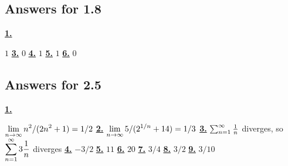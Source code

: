 \subsection *{Answers for 1.8}
\hypertarget {a:1.8.1}{\hyperlink {e:1.8.1}{\bfseries 1.}} \mdseries $1$\qquad 
\hypertarget {a:1.8.3}{\hyperlink {e:1.8.3}{\bfseries 3.}} \mdseries $0$\qquad 
\hypertarget {a:1.8.4}{\hyperlink {e:1.8.4}{\bfseries 4.}} \mdseries $1$\qquad 
\hypertarget {a:1.8.5}{\hyperlink {e:1.8.5}{\bfseries 5.}} \mdseries $1$\qquad 
\hypertarget {a:1.8.6}{\hyperlink {e:1.8.6}{\bfseries 6.}} \mdseries $0$\qquad 
\subsection *{Answers for 2.5}
\hypertarget {a:2.5.1}{\hyperlink {e:2.5.1}{\bfseries 1.}} \mdseries $\displaystyle \lim _{n\to \infty } n^2/(2n^2+1)=1/2$\qquad 
\hypertarget {a:2.5.2}{\hyperlink {e:2.5.2}{\bfseries 2.}} \mdseries $\displaystyle \lim _{n\to \infty } 5/(2^{1/n}+14)=1/3$\qquad 
\hypertarget {a:2.5.3}{\hyperlink {e:2.5.3}{\bfseries 3.}} \mdseries $\sum _{n=1}^\infty {1\over n}$ diverges, so $\displaystyle \sum _{n=1}^\infty 3{1\over n}$ diverges\qquad 
\hypertarget {a:2.5.4}{\hyperlink {e:2.5.4}{\bfseries 4.}} \mdseries $-3/2$\qquad 
\hypertarget {a:2.5.5}{\hyperlink {e:2.5.5}{\bfseries 5.}} \mdseries $11$\qquad 
\hypertarget {a:2.5.6}{\hyperlink {e:2.5.6}{\bfseries 6.}} \mdseries $20$\qquad 
\hypertarget {a:2.5.7}{\hyperlink {e:2.5.7}{\bfseries 7.}} \mdseries $3/4$\qquad 
\hypertarget {a:2.5.8}{\hyperlink {e:2.5.8}{\bfseries 8.}} \mdseries $3/2$\qquad 
\hypertarget {a:2.5.9}{\hyperlink {e:2.5.9}{\bfseries 9.}} \mdseries $3/10$\qquad 
